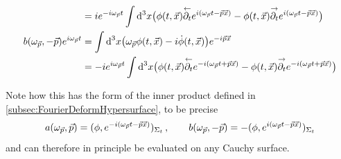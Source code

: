 \begin{subequations}
\begin{align}
                                                                & ={i} e^{-{i}\omega_{\vec{p}}t}\int\text{d}^3x\big(\phi(t,\vec{x})\overset{\leftarrow}{\partial_t}e^{{i}(\omega_{\vec{p}}t-\vec{p}\vec{x})}-\phi(t,\vec{x})\overset{\rightarrow}{\partial_t}e^{{i}(\omega_{\vec{p}}t-\vec{p}\vec{x})}\big)   \\
        b(\omega_{\vec{p}},-\vec{p})e^{{i}\omega_{\vec{p}}t} & =\int\text{d}^3x\big(\omega_{\vec{p}}\phi(t,\vec{x})-{i}\dot{\phi}(t,\vec{x})\big)e^{-{i}\vec{p}\vec{x}}                                                                                                                                          \\
                                                                & =-{i} e^{{i}\omega_{\vec{p}}t}\int\text{d}^3x\big(\phi(t,\vec{x})\overset{\leftarrow}{\partial_t}e^{-{i}(\omega_{\vec{p}}t+\vec{p}\vec{x})}-\phi(t,\vec{x})\overset{\rightarrow}{\partial_t}e^{-{i}(\omega_{\vec{p}}t+\vec{p}\vec{x})}\big)
    \end{align}
\end{subequations}

Note how this has the form of the inner product defined in \ref{subsec:FourierDeformHypersurface}, to be precise
\begin{equation}
    a(\omega_{\vec{p}},\vec{p})=(\phi,e^{-{i}(\omega_{\vec{p}}t-\vec{p}\vec{x})})_{\Sigma_t}\,,\qquad b(\omega_{\vec{p}},-\vec{p})=-(\phi,e^{{i}(\omega_{\vec{p}}t-\vec{p}\vec{x})})_{\Sigma_t}
\end{equation}
and can therefore in principle be evaluated on any Cauchy surface.

